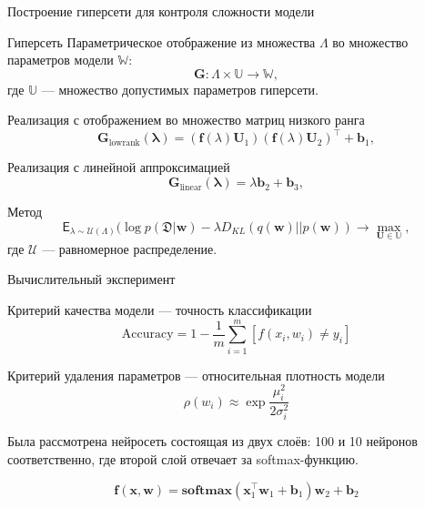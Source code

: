 \documentclass[9pt,pdf,hyperref={unicode}]{beamer}
\begin{document}
\begin{frame}[shrink=5]{Построение гиперсети для контроля сложности модели}
\begin{block}{Гиперсеть}
    Параметрическое отображение из множества $\Lambda$ во множество параметров модели $\mathbb{W}$:
    \[ \mathbf{G}: \Lambda \times \mathbb{U} \to \mathbb{W},\]
    где $\mathbb{U}$ --- множество допустимых параметров гиперсети. 
\end{block}
\begin{block}{Реализация с отображением во множество матриц низкого ранга}
    \begin{equation*}
        \mathbf{G}_\text{lowrank}(\mathbf{\lambda})= 
        (\mathbf{f}(\lambda)\mathbf{U}_1) (\mathbf{f} (\lambda) \mathbf{U}_2)^\top + \mathbf{b}_1,
    \end{equation*}
\end{block}
\begin{block}{Реализация с линейной аппроксимацией}
    \begin{equation*}
    \label{hyper2}
    \mathbf{G}_\text{linear}(\mathbf{\lambda})= \lambda\mathbf{b}_2 + \mathbf{b}_3,
    \end{equation*}
\end{block}
\begin{block}{Метод}
    \[\mathsf{E}_{\lambda \sim \mathcal{U}(\Lambda)} (\log p(\mathfrak{D}| \mathbf{w}) - \lambda D_{KL}(q(\mathbf{w})||p(\mathbf{w})) 
\to \max_{\mathbf{U} \in \mathbb{U}},\]
где $\mathcal{U}$ --- равномерное распределение.
\end{block}


\end{frame}
\begin{frame}{Вычислительный эксперимент}
\begin{block}{Критерий качества модели --- точность классификации}
    \[ \text{Accuracy} = 1 - \frac{1}{m} \sum_{i = 1}^{m}[f(x_i, w_i) \neq y_i] \]
\end{block}
\begin{block}{Критерий удаления параметров --- относительная плотность модели}
\[ \rho(w_i) \approx \exp{\frac{\mu_i^{2}}{2 \sigma_i^{2}}} \]
\end{block}

Была рассмотрена нейросеть состоящая из двух слоёв: 100 и 10 нейронов соответственно,
где второй слой отвечает за softmax-функцию.

$$\mathbf{f}(\mathbf{x}, \mathbf{w})= \textbf{softmax}(\mathbf{x}_1^{\top} \mathbf{w}_1 + \mathbf{b}_1)\mathbf{w}_2 + \mathbf{b}_2$$

\end{frame}
\end{document}
